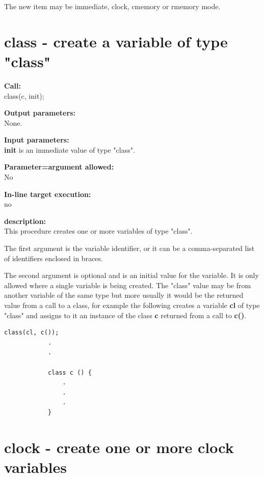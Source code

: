         The new item may be immediate, clock, cmemory or rmemory mode.


    \section{class - create a variable of type "class"}\label{sec:ipclass}

        {\bf Call:} \\
        class(c, init);

        {\bf Output parameters:} \\
        None.

        {\bf Input parameters:} \\            
        {\bf init} is an immediate value of type "class".
        
        {\bf Parameter=argument allowed:} \\
        No

        {\bf In-line target execution:} \\
        no

        {\bf description:} \\
        This procedure creates one or more variables of type "class".
        
        The first argument is the variable identifier, or it can be a
        comma-separated list of identifiers enclosed in braces.
        
        The second argument is optional and is an initial value for the variable.
        It is only allowed where a single variable is being created. The "class"
        value may be from another variable of the same type but more usually it
        would be the returned value from a call to a class, for example the
        following creates a variable {\bf cl} of type "class" and assigns to it
        an instance of the class {\bf c} returned from a call to {\bf c()}.

        \begin{lstlisting}[gobble=8, language=threepl]
            class(cl, c());
            .
            .
            
            class c () {
                .
                .
                .
            }
        \end{lstlisting}



    \section{clock - create one or more clock variables}\label{sec:ipclock}
        
